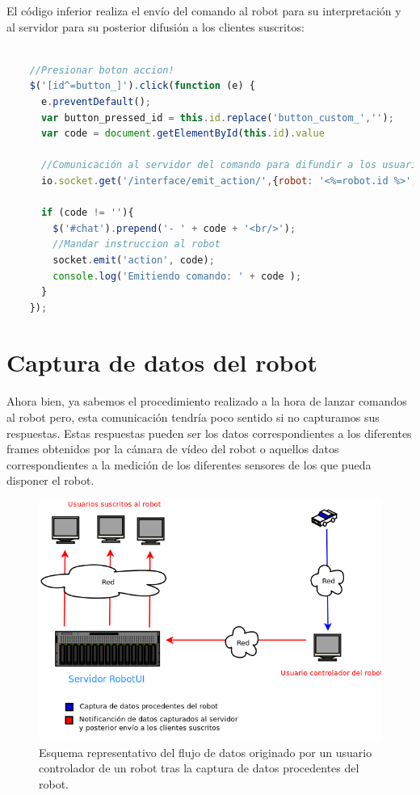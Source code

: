   
El código inferior realiza el envío del comando al robot para su interpretación y al servidor para su posterior difusión a los clientes suscritos:\\
 
 \begin{lstlisting}[language=JavaScript]
 
    //Presionar boton accion!
    $('[id^=button_]').click(function (e) {
      e.preventDefault();
      var button_pressed_id = this.id.replace('button_custom_','');
      var code = document.getElementById(this.id).value

      //Comunicación al servidor del comando para difundir a los usuarios espectadores
      io.socket.get('/interface/emit_action/',{robot: '<%=robot.id %>', id: button_pressed_id, msg: code })

      if (code != ''){
        $('#chat').prepend('- ' + code + '<br/>');
        //Mandar instruccion al robot
        socket.emit('action', code);
        console.log('Emitiendo comando: ' + code );
      }
    });

 \end{lstlisting}
 
 
\section{Captura de datos del robot}

 Ahora bien, ya sabemos el procedimiento realizado a la hora de lanzar comandos al robot pero, esta comunicación tendría poco sentido si no capturamos sus respuestas. Estas respuestas pueden ser los datos correspondientes
 a los diferentes frames obtenidos por la cámara de vídeo del robot o aquellos datos correspondientes a la medición de los diferentes sensores de los que pueda disponer el robot.

 
 \begin{figure}[H]
  \begin{center}
    \includegraphics[scale=0.5]{diagramas/flujo_comunicaciones_captura.png}
  \end{center}
  \caption{Esquema representativo del flujo de datos originado por un usuario controlador de un robot tras la captura de datos procedentes del robot.}
  \label{diagram:conexiones-controlador}
\end{figure}
 
